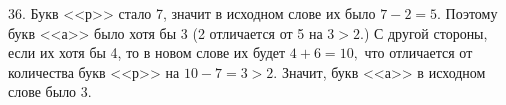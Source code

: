36. Букв <<р>> стало 7, значит в исходном слове их было $7-2=5.$ Поэтому букв <<а>> было хотя бы 3 (2 отличается от 5 на $3>2.$) С другой стороны, если их хотя бы 4, то в новом слове  их будет $4+6=10,$ что отличается от количества букв <<р>> на $10-7=3>2.$ Значит, букв <<а>> в исходном слове было 3.\\
